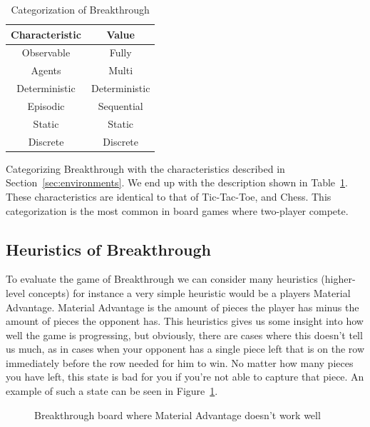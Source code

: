 \begin{table}[ht]
  \centering
  \begin{tabular}{|c|c|}\hline
    \textbf{Characteristic} & \textbf{Value} \\\hline
    Observable              & Fully          \\
    Agents                  & Multi          \\
    Deterministic           & Deterministic  \\
    Episodic                & Sequential     \\
    Static                  & Static         \\
    Discrete                & Discrete       \\\hline
  \end{tabular}
  \caption{Categorization of Breakthrough}
  \label{tab:breakthrough_cat}
\end{table}

Categorizing Breakthrough with the characteristics described in Section~\ref{sec:environments}. We end up with the description shown in Table~\ref{tab:breakthrough_cat}. These characteristics are identical to that of Tic-Tac-Toe, and Chess. This categorization is the most common in board games where two-player compete.

\subsection{Heuristics of Breakthrough}

To evaluate the game of Breakthrough we can consider many heuristics (higher-level concepts) for instance a very simple heuristic would be a players Material Advantage. Material Advantage is the amount of pieces the player has minus the amount of pieces the opponent has. This heuristics gives us some insight into how well the game is progressing, but obviously, there are cases where this doesn't tell us much, as in cases when your opponent has a single piece left that is on the row immediately before the row needed for him to win. No matter how many pieces you have left, this state is bad for you if you're not able to capture that piece. An example of such a state can be seen in Figure~\ref{fig:bt_h1_bad}.

\begin{figure}[]
  \centering
  \caption{Breakthrough board where Material Advantage doesn't work well}
  \label{fig:bt_h1_bad}
\end{figure}

